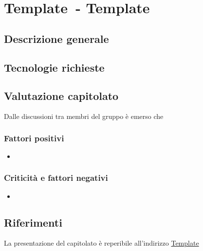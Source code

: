 
\renewcommand{\capName}{Template} %
\renewcommand{\capCode}{Template} %
\renewcommand{\capLink}{Template} %
\renewcommand{\capProposer}{Template} %


\section{\capCode\ - \capName} 
\subsection{Descrizione generale}

\subsection{Tecnologie richieste}

\subsection{Valutazione capitolato}
Dalle discussioni tra membri del gruppo è emerso che

\subsubsection{Fattori positivi}

\begin{itemize}
    \item 
\end{itemize}

\subsubsection{Criticità e fattori negativi}

\begin{itemize}
    \item 
\end{itemize}

\subsection{Riferimenti}
La presentazione del capitolato è reperibile all'indirizzo \url{\capLink}